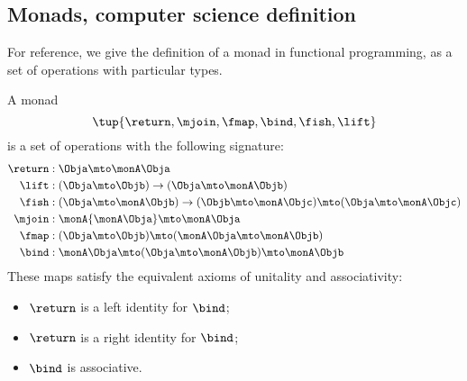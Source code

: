 
\subsection{Monads, computer science definition}
\label{sec:monads-CS}
For reference, we give the definition of a monad in functional programming,
as a set of operations with particular types.

\begin{definition}
    \label{def:monad-computer-science}
    A monad \begin{equation}
        \tup{\return,\mjoin,\fmap,\bind,\fish,\lift}
    \end{equation}
    is a set of operations with the following signature:
    \begin{align*}
        \return & :\Obja\mto\monA \Obja \\
        \lift   & :(\Obja\mto \Objb)\to( \Obja\mto\monA \Objb) \\
        \fish   & :(\Obja\mto\monA \Objb)\to(\Objb\mto\monA \Objc)\mto(\Obja\mto\monA \Objc) \\
        \mjoin  & :\monA{\monA \Obja}\mto\monA \Obja \\
        \fmap   & :(\Obja\mto \Objb)\mto(\monA \Obja\mto\monA \Objb) \\
        \bind   & :\monA \Obja\mto(\Obja\mto\monA \Objb)\mto\monA \Objb
    \end{align*}
    These maps satisfy the equivalent axioms of unitality and associativity:
    \begin{itemize}
        \item $\return$ is a left identity for $\bind$;
        \item $\return$ is a right identity for $\bind$;
        \item $\bind$ is associative.
    \end{itemize}
\end{definition}

